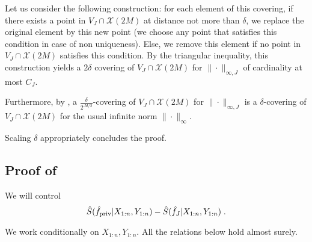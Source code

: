 \documentclass{article}
\theoremstyle{plain}
\theoremstyle{definition}
\theoremstyle{remark}
\begin{document}
Let us consider the following construction: for each element of this covering, if there exists a point in $V_J \cap \mathcal{X}(2M)$ at distance not more than $\delta$, we replace the original element by this new point (we choose any point that satisfies this condition in case of non uniqueness). 
Else, we remove this element if no point in $V_J \cap \mathcal{X}(2M)$ satisfies this condition. 
By the triangular inequality, this construction yields a $2 \delta$ covering of $V_J \cap \mathcal{X}(2M)$ for $\| \cdot\|_{\infty,J}$ of cardinality at most $C_J$.

Furthermore, by , a $\frac{\delta}{2^{Jd/2}}$-covering of $V_J \cap \mathcal{X}(2M)$ for $\| \cdot\|_{\infty,J}$ is a $\delta$-covering of $V_J \cap \mathcal{X}(2M)$ for the usual infinite norm $\| \cdot\|_{\infty}$.

Scaling $\delta$ appropriately concludes the proof.

\subsection{Proof of }
\label{proof_of_bias_variance_tradeoff}

We will control
\begin{equation}
    {\hat{S}(\hat{f}_{\text{\normalshape priv}} | X_{1:n}, Y_{1:n}) - \hat{S}(\hat{f}_{J} | X_{1:n}, Y_{1:n})} \;.
\end{equation}

We work conditionally on $X_{1:n}, Y_{1:n}$. 
All the relations below hold almost surely.
\end{document}
